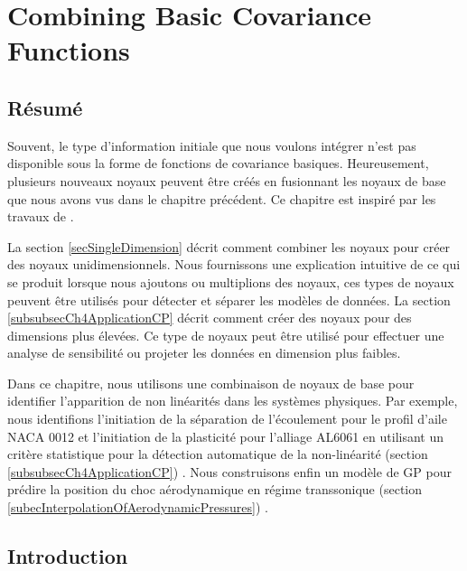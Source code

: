 \chapter{Combining Basic Covariance Functions}
\label{chapCombiningBasicCovariances}

\begin{mdframed}[hidealllines=true,backgroundcolor=lightgray!20]
\section*{Résumé}
Souvent, le type d'information initiale que nous voulons intégrer n'est pas disponible sous la forme de fonctions de covariance basiques. Heureusement, plusieurs nouveaux noyaux peuvent être créés en fusionnant les noyaux de base que nous avons vus dans le chapitre précédent. Ce chapitre est inspiré par les travaux de  \cite{bishop2006pattern, mackay2003information, durrande2001etude, durrande2013anova}.


La section \ref{secSingleDimension} décrit comment combiner les noyaux pour créer des noyaux unidimensionnels. Nous fournissons une explication intuitive de ce qui se produit lorsque nous ajoutons ou multiplions des noyaux, ces types de noyaux peuvent être utilisés pour détecter et séparer les modèles de données. La section \ref{subsubsecCh4ApplicationCP} décrit comment créer des noyaux pour des dimensions plus élevées. Ce type de noyaux peut être utilisé pour effectuer une analyse de sensibilité ou projeter les données en dimension plus faibles.


Dans ce chapitre, nous utilisons une combinaison de noyaux de base pour identifier l'apparition de non linéarités dans les systèmes physiques. Par exemple, nous identifions l'initiation de la séparation de l'écoulement pour le profil d'aile NACA 0012 et l'initiation de la plasticité pour l'alliage AL6061 en utilisant un critère statistique pour la détection automatique de la non-linéarité (section \ref{subsubsecCh4ApplicationCP}) \cite{chiplunkar:hal-01555401}. Nous construisons enfin un modèle de GP pour prédire la position du choc aérodynamique en régime transsonique (section \ref{subecInterpolationOfAerodynamicPressures}) \cite{oatao18004}.
\end{mdframed}



\section{Introduction}

